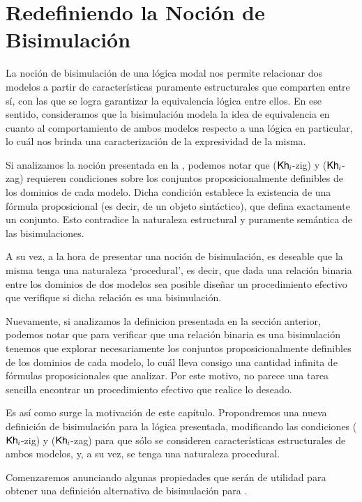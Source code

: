 \chapter{Redefiniendo la Noción de Bisimulación}

La noción de bisimulación de una lógica modal nos permite relacionar dos modelos a partir de características puramente estructurales 
que comparten entre sí, con las que se logra garantizar la equivalencia lógica entre ellos. En ese sentido, consideramos que la 
bisimulación modela la idea de equivalencia en cuanto al comportamiento de ambos modelos respecto a una lógica en particular, lo cuál nos brinda
una caracterización de la expresividad de la misma.

Si analizamos la noción presentada en la , podemos notar que ($\mathsf{Kh}_i$-zig) y ($\mathsf{Kh}_i$-zag) requieren condiciones 
sobre los conjuntos proposicionalmente definibles de los dominios de cada modelo. Dicha condición establece la existencia de una fórmula proposicional
(es decir, de un objeto sintáctico), que defina exactamente un conjunto. Esto contradice la naturaleza estructural y puramente semántica 
de las bisimulaciones. 

A su vez, a la hora de presentar una noción de bisimulación, es deseable que la misma tenga una naturaleza `procedural', es decir,
que dada una relación binaria entre los dominios de dos modelos sea posible diseñar un procedimiento efectivo que verifique si dicha relación 
es una bisimulación.

Nuevamente, si analizamos la definicion presentada en la sección anterior, podemos notar que para verificar que una relación binaria es una bisimulación
tenemos que explorar necesariamente los conjuntos proposicionalmente definibles de los dominios de cada modelo, lo cuál lleva consigo una cantidad 
infinita de fórmulas proposicionales que analizar. Por este motivo, no parece una tarea sencilla encontrar un procedimiento efectivo que realice lo deseado.

Es así como surge la motivación de este capítulo. Propondremos una nueva definición de bisimulación para la lógica presentada, modificando las condiciones
($\mathsf{Kh}_i$-zig) y ($\mathsf{Kh}_i$-zag) para que sólo se consideren características estructurales de ambos modelos, y, a su vez, se tenga una naturaleza procedural.

Comenzaremos anunciando algunas propiedades que serán de utilidad para obtener una definición alternativa de bisimulación para \KHilogic.

